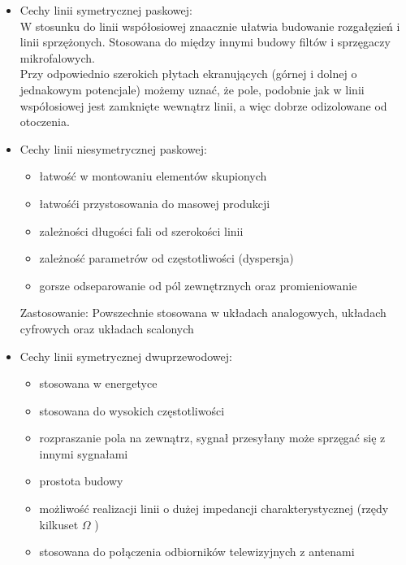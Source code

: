 \begin{solution}
\begin{itemize}
\item Cechy linii symetrycznej paskowej:\\ W stosunku do linii współosiowej znaacznie ułatwia budowanie rozgałęzień i linii sprzężonych. Stosowana do między innymi budowy filtów i sprzęgaczy mikrofalowych.\\
Przy odpowiednio szerokich płytach ekranujących (górnej i dolnej o jednakowym potencjale) możemy uznać, że pole, podobnie jak w linii współosiowej jest zamknięte wewnątrz linii, a więc dobrze odizolowane od otoczenia.

\item Cechy linii niesymetrycznej paskowej:
	\begin{itemize}
	\item łatwość w montowaniu elementów skupionych
	\item łatwośći przystosowania do masowej produkcji
	\item zależności długości fali od szerokości linii
	\item zależność parametrów od częstotliwości (dyspersja)
	\item gorsze odseparowanie od pól zewnętrznych oraz promieniowanie
	\end{itemize}
Zastosowanie: Powszechnie stosowana w układach analogowych, układach cyfrowych oraz układach scalonych
\item Cechy linii symetrycznej dwuprzewodowej:
	\begin{itemize}
	\item stosowana w energetyce
	\item stosowana do wysokich częstotliwości
	\item rozpraszanie pola na zewnątrz, sygnał przesyłany może sprzęgać się z innymi sygnałami
	\item prostota budowy
	\item możliwość realizacji linii o dużej impedancji charakterystycznej (rzędy kilkuset $\Omega$ )
	\item stosowana do połączenia odbiorników telewizyjnych z antenami
	\end{itemize}
\end{itemize}
\end{solution}
